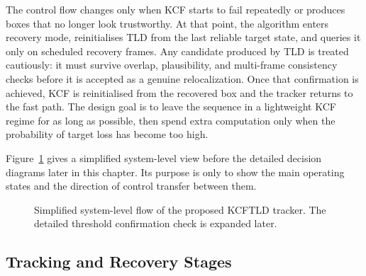 \documentclass[12pt,a4paper]{article}
\begin{document}
The control flow changes only when KCF starts to fail repeatedly or produces boxes that no longer look trustworthy. At that point, the algorithm enters recovery mode, reinitialises TLD from the last reliable target state, and queries it only on scheduled recovery frames. Any candidate produced by TLD is treated cautiously: it must survive overlap, plausibility, and multi-frame consistency checks before it is accepted as a genuine relocalization. Once that confirmation is achieved, KCF is reinitialised from the recovered box and the tracker returns to the fast path. The design goal is to leave the sequence in a lightweight KCF regime for as long as possible, then spend extra computation only when the probability of target loss has become too high.

Figure~\ref{fig:kcf-tld-system-overview} gives a simplified system-level view before the detailed decision diagrams later in this chapter. Its purpose is only to show the main operating states and the direction of control transfer between them.

\begin{figure}[htbp]
	\centering
	\caption{Simplified system-level flow of the proposed KCF\textendash TLD tracker. The detailed threshold confirmation check is expanded later.}
	\label{fig:kcf-tld-system-overview}
\end{figure}

\subsection{Tracking and Recovery Stages}
\end{document}
